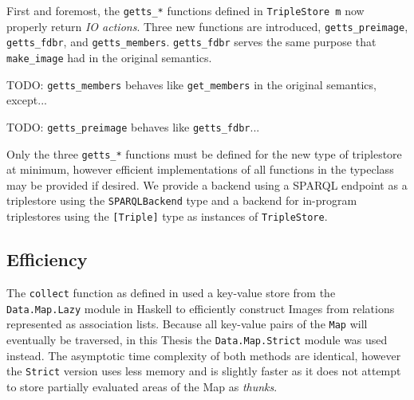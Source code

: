 \documentclass[../main.tex]{subfiles}
\begin{document}
First and foremost, the \texttt{getts\_*} functions defined in \texttt{TripleStore m} now properly return {\em IO actions}.
Three new functions are introduced, \texttt{getts\_preimage}, \texttt{getts\_fdbr}, and \texttt{getts\_members}.
\texttt{getts\_fdbr} serves the same purpose that \texttt{make\_image} had in the original semantics.

TODO: \texttt{getts\_members} behaves like \texttt{get\_members} in the original semantics, except...

TODO: \texttt{getts\_preimage} behaves like \texttt{getts\_fdbr}...

Only the three \texttt{getts\_*} functions must be defined for the new type of triplestore at minimum, however efficient implementations
of all functions in the typeclass may be provided if desired.  We provide a backend using a SPARQL endpoint as a triplestore using the
\texttt{SPARQLBackend} type and a backend for in-program triplestores using the \texttt{[Triple]} type as instances of \texttt{TripleStore}.




\subsection{Efficiency}

The \texttt{collect} function as defined in \cite{agboola2015extensible} used a key-value store from the \texttt{Data.Map.Lazy} module in Haskell to efficiently construct Images from relations represented as association lists.  Because all key-value pairs of the \texttt{Map} will eventually be traversed, in this Thesis the \texttt{Data.Map.Strict} module was used instead.  The asymptotic time complexity of both methods are identical, however the \texttt{Strict} version uses less memory and is slightly faster as it does not attempt to store partially evaluated areas of the Map as {\em thunks}.




\end{document}
